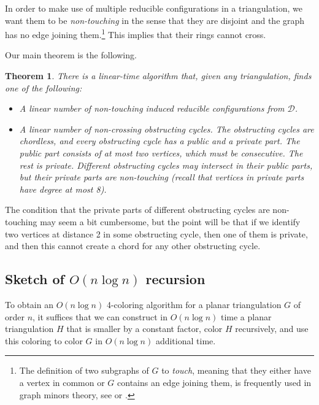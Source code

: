 \documentclass[10pt,a4paper]{article}
\newtheorem{thm}{Theorem}[section]
\def\cD{{\mathcal D}}
\def\showlabel#1{}
\begin{document}
In order to make use of multiple reducible configurations in a triangulation, we want them to be \emph{non-touching} in the sense that they are disjoint and the graph has no edge joining them.\footnote{The definition of two subgraphs of $G$ to \emph{touch}, meaning that they either have a vertex in common or $G$ contains an edge joining them, is frequently used in graph minors theory, see \cite{Diestel_book,DvorakBook} or \cite{reed1997tree}.} This implies that their rings cannot cross.

Our main theorem is the following.

\begin{thm}\label{thm:main-linear}\showlabel{thm:main-linear}
    There is a linear-time algorithm that, given any triangulation, finds one of the following: \begin{itemize}
    \item A linear number of non-touching induced reducible configurations from $\cD$.
    \item A linear number of non-crossing obstructing cycles. The obstructing cycles are chordless, and every obstructing cycle has a \emph{public} and a \emph{private part}. 
    The public part consists of at most two vertices, which must be consecutive. The rest is private. Different obstructing cycles may intersect in their public parts, but their private parts are non-touching (recall that  vertices in private parts have degree at most 8).
    \end{itemize}
\end{thm}

The condition that the private parts of different obstructing cycles are non-touching may seem a bit cumbersome, but the point will be that if we identify two 
vertices at distance 2 in some obstructing cycle, then one of them is private, and then this cannot create a chord for any other obstructing cycle.


\subsection{Sketch of $O(n\log n)$ recursion}
\label{sec:algorithm-sketch}\showlabel{sec:algorithm-sketch}

To obtain an $O(n\log n)$ 4-coloring algorithm for a planar triangulation $G$ of order $n$, it suffices that we can construct in $O(n\log n)$ time a planar triangulation $H$ that is smaller by a constant factor, color $H$ recursively, and use this coloring to color $G$ in $O(n\log n)$ additional time.
\end{document}
